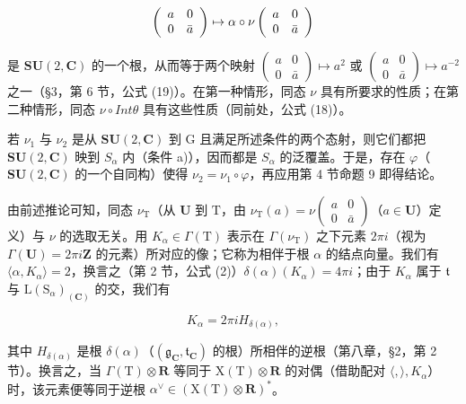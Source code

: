 \[
\left( \begin{array}{c c} a & 0 \\ 0 & \bar {a} \end{array} \right) \mapsto \alpha \circ \nu \left( \begin{array}{c c} a & 0 \\ 0 & \bar {a} \end{array} \right)
\]

是 \(\mathbf{SU}(2,\mathbf{C})\) 的一个根，从而等于两个映射 \(\begin{pmatrix}a&0\\ 0&\bar{a}\end{pmatrix}\mapsto a^{2}\) 或 \(\begin{pmatrix}a&0\\ 0&\bar{a}\end{pmatrix}\mapsto a^{-2}\) 之一（§3，第 6 节，公式 (19)）。在第一种情形，同态 \(\nu\) 具有所要求的性质；在第二种情形，同态 \(\nu\circ Int\theta\) 具有这些性质（同前处，公式 (18)）。

若 \(\nu_{1}\) 与 \(\nu_{2}\) 是从 \(\mathbf{SU}(2,\mathbf{C})\) 到 G 且满足所述条件的两个态射，则它们都把 \(\mathbf{SU}(2,\mathbf{C})\) 映到 \(S_{\alpha}\) 内（条件 a)），因而都是 \(S_{\alpha}\) 的泛覆盖。于是，存在 \(\varphi\)（\(\mathbf{SU}(2,\mathbf{C})\) 的一个自同构）使得 \(\nu_{2} = \nu_{1} \circ \varphi\)，再应用第 4 节命题 9 即得结论。

由前述推论可知，同态 \(\nu_{\mathrm{T}}\)（从 \(\mathbf{U}\) 到 \(\mathrm{T}\)，由 \(\nu_{\mathrm{T}}(a) = \nu \left( \begin{array}{cc}a & 0\\ 0 & \bar{a} \end{array} \right)\)（\(a\in \mathbf{U}\)）定义）与 \(\nu\) 的选取无关。用 \(K_{\alpha}\in \Gamma (\mathrm{T})\) 表示在 \(\Gamma (\nu_{\mathrm{T}})\) 之下元素 \(2\pi i\)（视为 \(\Gamma (\mathbf{U}) = 2\pi i\mathbf{Z}\) 的元素）所对应的像；它称为相伴于根 \(\alpha\) 的结点向量。我们有 \(\langle \alpha ,K_{\alpha}\rangle = 2\)，换言之（第 2 节，公式 (2)）\(\delta (\alpha)(K_{\alpha}) = 4\pi i\)；由于 \(K_{\alpha}\) 属于 \(\mathfrak{t}\) 与 \(\mathrm{L}(\mathrm{S}_{\alpha})_{(\mathbf{C})}\) 的交，我们有

\[
K _ {\alpha} = 2 \pi i H _ {\delta (\alpha)},\tag{13}
\]

其中 \(H_{\delta(\alpha)}\) 是根 \(\delta(\alpha)\)（\((\mathfrak{g}_{\mathbf{C}}, \mathfrak{t}_{\mathbf{C}})\) 的根）所相伴的逆根（第八章，§2，第 2 节）。换言之，当 \(\Gamma(\mathrm{T}) \otimes \mathbf{R}\) 等同于 \(\mathrm{X(T)}\otimes \mathbf{R}\) 的对偶（借助配对 \(\langle ,\rangle ,K_{\alpha}\)）时，该元素便等同于逆根 \(\alpha^{\vee}\in (\mathrm{X(T)}\otimes \mathbf{R})^{*}\)。

